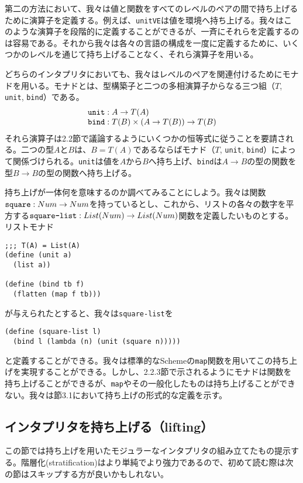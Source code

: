 \documentclass[11pt, oneside]{jsbook}   	%
\begin{document}
第二の方法において、我々は値と関数をすべてのレベルのペアの間で持ち上げるために演算子を定義する。例えば、\verb|unitVE|は値を環境へ持ち上げる。我々はこのような演算子を段階的に定義することができるが、一斉にそれらを定義するのは容易である。それから我々は各々の言語の構成を一度に定義するために、いくつかのレベルを通じて持ち上げることなく、それら演算子を用いる。

どちらのインタプリタにおいても、我々はレベルのペアを関連付けるためにモナドを用いる。モナドとは、型構築子と二つの多相演算子からなる三つ組（$T$, \verb|unit|, \verb|bind|）である。
$$
\begin{array}{l}
\verb|unit| : A \rightarrow T(A) \\
\verb|bind| : T(B) \times (A \rightarrow T(B)) \rightarrow T(B)
\end{array}
$$
それら演算子は2.2節で議論するようにいくつかの恒等式に従うことを要請される。二つの型$A$と$B$は、$B = T(A)$であるならばモナド（$T$, \verb|unit|, \verb|bind|）によって関係づけられる。\verb|unit|は値を$A$から$B$へ持ち上げ、\verb|bind|は$A \rightarrow B$の型の関数を型$B \rightarrow B$の型の関数へ持ち上げる。

持ち上げが一体何を意味するのか調べてみることにしよう。我々は関数$\verb|square|:Num \rightarrow Num$を持っているとし、これから、リストの各々の数字を平方する$\verb|square-list|:List(Num) \rightarrow List(Num)$関数を定義したいものとする。リストモナド
\begin{lstlisting}
;;; T(A) = List(A)
(define (unit a)
  (list a))

(define (bind tb f)
  (flatten (map f tb)))
\end{lstlisting}
が与えられたとすると、我々は\verb|square-list|を
\begin{lstlisting}
(define (square-list l)
  (bind l (lambda (n) (unit (square n)))))
\end{lstlisting}
と定義することができる。我々は標準的なSchemeの\verb|map|関数を用いてこの持ち上げを実現することができる。しかし、2.2.3節で示されるようにモナドは関数を持ち上げることができるが、\verb|map|やその一般化したものは持ち上げることができない。我々は節3.1において持ち上げの形式的な定義を示す。
\subsection{インタプリタを持ち上げる（lifting）}
この節では持ち上げを用いたモジュラーなインタプリタの組み立てたもの提示する。階層化(stratification)はより単純でより強力であるので、初めて読む際は次の節はスキップする方が良いかもしれない。
\end{document}
